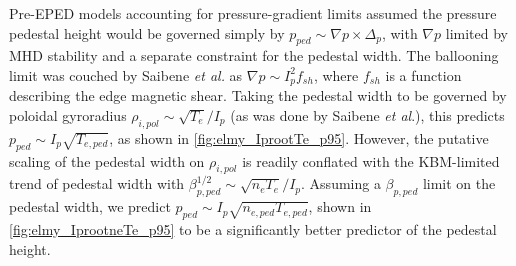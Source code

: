 \begin{figure}[t]
 \pushtooutside
\end{figure}

Pre-EPED models accounting for pressure-gradient limits assumed the pressure pedestal height would be governed simply by $p_{ped} \sim \nabla p \times \Delta_p$, with $\nabla p$ limited by MHD stability and a separate constraint for the pedestal width.  The ballooning limit was couched by Saibene \emph{et al.} \cite{Saibene1999} as $\nabla p \sim I_p^2 f_{sh}$, where $f_{sh}$ is a function describing the edge magnetic shear.  Taking the pedestal width to be governed by poloidal gyroradius $\rho_{i,pol} \sim \sqrt{T_e}/I_p$ (as was done by Saibene \emph{et al}.), this predicts $p_{ped} \sim I_p \sqrt{T_{e,ped}}$, as shown in \cref{fig:elmy_IprootTe_p95}.  However, the putative scaling of the pedestal width on $\rho_{i,pol}$ is readily conflated with the KBM-limited trend of pedestal width with $\beta_{p,ped}^{1/2} \sim \sqrt{n_e T_e}/I_p$.  Assuming a $\beta_{p,ped}$ limit on the pedestal width, we predict $p_{ped} \sim I_p \sqrt{n_{e,ped} T_{e,ped}}$, shown in \cref{fig:elmy_IprootneTe_p95} to be a significantly better predictor of the pedestal height.

